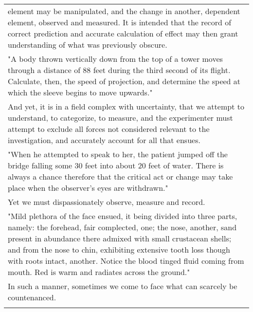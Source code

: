 \begin{longtable}[]{@{}l@{}}
\begin{minipage}[t]{0.97\columnwidth}
element may be manipulated, and the change in another, dependent
element, observed and measured. It is intended that the record of
correct prediction and accurate calculation of effect may then grant
understanding of what was previously obscure.\strut
\end{minipage}\tabularnewline
\begin{minipage}[t]{0.97\columnwidth}\raggedright
"A body thrown vertically down from the top of a tower moves through a
distance of 88 feet during the third second of its flight. Calculate,
then, the speed of projection, and determine the speed at which the
sleeve begins to move upwards."\strut
\end{minipage}\tabularnewline
\begin{minipage}[t]{0.97\columnwidth}\raggedright
And yet, it is in a field complex with uncertainty, that we attempt to
understand, to categorize, to measure, and the experimenter must attempt
to exclude all forces not considered relevant to the investigation, and
accurately account for all that ensues.\strut
\end{minipage}\tabularnewline
\begin{minipage}[t]{0.97\columnwidth}\raggedright
"When he attempted to speak to her, the patient jumped off the bridge
falling some 30 feet into about 20 feet of water. There is always a
chance therefore that the critical act or change may take place when the
observer's eyes are withdrawn."\strut
\end{minipage}\tabularnewline
\begin{minipage}[t]{0.97\columnwidth}\raggedright
Yet we must dispassionately observe, measure and record.\strut
\end{minipage}\tabularnewline
\begin{minipage}[t]{0.97\columnwidth}\raggedright
"Mild plethora of the face ensued, it being divided into three parts,
namely: the forehead, fair complected, one; the nose, another, sand
present in abundance there admixed with small crustacean shells; and
from the nose to chin, exhibiting extensive tooth loss though with roots
intact, another. Notice the blood tinged fluid coming from mouth. Red is
warm and radiates across the ground."\strut
\end{minipage}\tabularnewline
\begin{minipage}[t]{0.97\columnwidth}\raggedright
In such a manner, sometimes we come to face what can scarcely be
countenanced.\strut
\end{minipage}\tabularnewline
\begin{minipage}[t]{0.97\columnwidth}\raggedright

\end{minipage}
\end{longtable}
